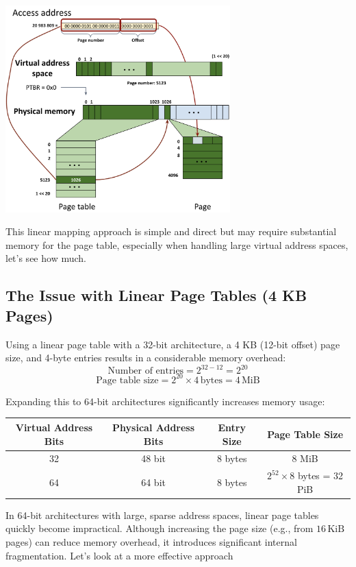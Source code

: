 \documentclass[../../compsys.tex]{subfiles}
\begin{document}
\begin{center}
  \includegraphics[width=0.65\textwidth]{chapters/L5/images/resolving.png}
\end{center}

This linear mapping approach is simple and direct but may require substantial memory for the page table, especially when handling large virtual address spaces, let's see how much.

\subsection{The Issue with Linear Page Tables (4 KB Pages)}

Using a linear page table with a 32-bit architecture, a 4 KB (12-bit offset) page size, and 4-byte entries results in a considerable memory overhead:
\[
\text{Number of entries} = 2^{32 - 12} = 2^{20}
\]
\[
\text{Page table size} = 2^{20} \times 4\,\text{bytes} = 4\,\text{MiB}
\]

Expanding this to 64-bit architectures significantly increases memory usage:

\begin{center}
\small
\begin{tabular}{|c|c|c|c|}
\hline
\textbf{Virtual Address Bits} & \textbf{Physical Address Bits} & \textbf{Entry Size} & \textbf{Page Table Size} \\
\hline
32 & 48 bit & 8 bytes & 8 MiB \\
64 & 64 bit & 8 bytes & $2^{52} \times 8$ bytes = 32 PiB \\
\hline
\end{tabular}
\end{center}
\normalsize
In 64-bit architectures with large, sparse address spaces, linear page tables quickly become impractical. Although increasing the page size (e.g., from \(16\,\mathrm{KiB}\) pages) can reduce memory overhead, it introduces significant internal fragmentation. Let's look at a more effective approach
\end{document}

